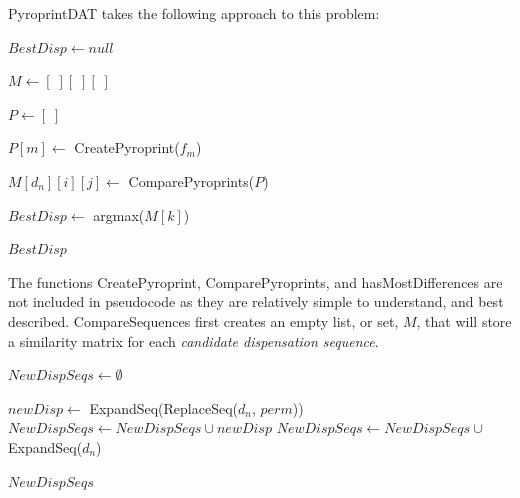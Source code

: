 \documentclass[12pt]{ucthesis}
\begin{document}
      PyroprintDAT takes the following approach to this problem:
      \begin{algorithmic}

            \State $BestDisp \gets null$

            \State $M \gets [\;][\;][\;]$

               \State $P \gets [\;]$

                  \State $P[m] \gets$ CreatePyroprint($f_m$)
               \EndFor

                     \State $M[d_n][i][j] \gets$ ComparePyroprints($P$)
                  \EndFor
               \EndFor
            \EndFor

            \State $BestDisp \gets$ argmax($M[k]$)

            \Return $BestDisp$
         \EndFunction
      \end{algorithmic}
      The functions \textsf{CreatePyroprint}, \textsf{ComparePyroprints}, and
      \textsf{hasMostDifferences} are not included in pseudocode as they are
      relatively simple to understand, and best described.
      \textsf{CompareSequences} first creates an empty list, or set, $M$, that
      will store a similarity matrix for each \textit{candidate dispensation
      sequence}.

      \begin{algorithmic}
            \State $NewDispSeqs \gets \emptyset$

                     \State $newDisp \gets$ ExpandSeq(ReplaceSeq($d_n$, $perm$))
                     \State $NewDispSeqs \gets NewDispSeqs \cup newDisp$
                  \EndFor
               \Else
                  \State $NewDispSeqs \gets NewDispSeqs \cup$ ExpandSeq($d_n$)
               \EndIf
            \EndFor

            \Return $NewDispSeqs$
         \EndFunction
      \end{algorithmic}
      
\end{document}
